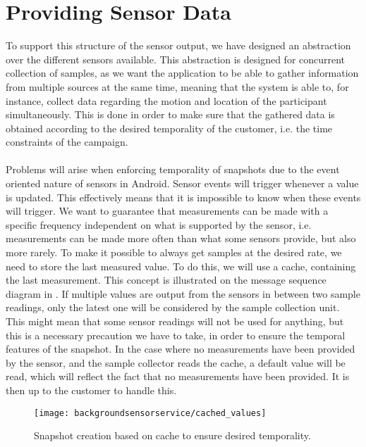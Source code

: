 
\section{Providing Sensor Data}
\label{sec:providing_sensor_data}

To support this structure of the sensor output, we have designed an abstraction over the different sensors available. This abstraction is designed for concurrent collection of samples, as we want the application to be able to gather information from multiple sources at the same time, meaning that the system is able to, for instance, collect data regarding the motion and location of the participant simultaneously. This is done in order to make sure that the gathered data is obtained according to the desired temporality of the customer, i.e. the time constraints of the campaign.
\\\\
Problems will arise when enforcing temporality of snapshots due to the event oriented nature of sensors in Android. Sensor events will trigger whenever a value is updated. This effectively means that it is impossible to know when these events will trigger. We want to guarantee that measurements can be made with a specific frequency independent on what is supported by the sensor, i.e. measurements can be made more often than what some sensors provide, but also more rarely. To make it possible to always get samples at the desired rate, we need to store the last measured value. To do this, we will use a cache, containing the last measurement. This concept is illustrated on the message sequence diagram in . If multiple values are output from the sensors in between two sample readings, only the latest one will be considered by the sample collection unit. This might mean that some sensor readings will not be used for anything, but this is a necessary precaution we have to take, in order to ensure the temporal features of the snapshot. In the case where no measurements have been provided by the sensor, and the sample collector reads the cache, a default value will be read, which will reflect the fact that no measurements have been provided. It is then up to the customer to handle this.

\begin{figure}[!htbp]
    \centering
    \texttt{[image: backgroundsensorservice/cached\_values]}
    \caption{Snapshot creation based on cache to ensure desired temporality.}
    \label{fig:cached_values}
\end{figure}
\FloatBarrier

